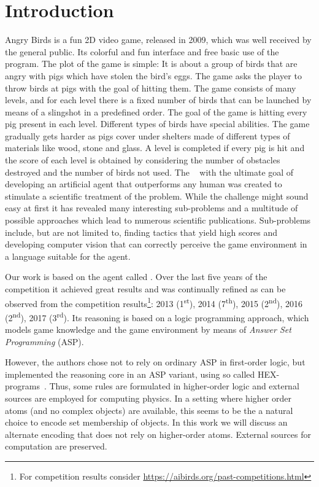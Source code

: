 \section{Introduction}
\label{sec:intro}

Angry Birds is a fun 2D video game, released in 2009, which was well received by the general public. Its colorful and fun interface and free basic use of
the program. The plot of the game is simple: It is about a group of birds that are angry with pigs which have stolen the bird's eggs. The game asks the player to throw birds at pigs with the goal of hitting them. The game consists of many levels, and for each level there is a fixed number of birds that can be launched by means of a slingshot in a predefined order. The goal of the game is hitting every pig present in each level. Different types of birds have special abilities. The game gradually gets harder as pigs cover under shelters made of different types of materials like wood, stone and glass. A level is completed if every pig is hit and the score of each level is obtained by considering the number of obstacles destroyed and the number of birds not used.
The \abc~\cite{angryAI} with the ultimate goal of developing an artificial agent that outperforms any human was created to stimulate a scientific treatment of the problem. While the challenge might sound easy at first it has revealed many interesting sub-problems and a multitude of possible approaches which lead to numerous scientific publications.
Sub-problems include, but are not limited to, finding tactics that yield high scores and developing computer vision that can correctly perceive the game environment in a language suitable for the agent.

Our work is based on the agent called \ah \cite{angryhex}. Over the last five years of the competition it achieved great results and was continually refined as can be observed from the competition results\footnote{For competition results consider \url{https://aibirds.org/past-competitions.html}}: 2013 (1\textsuperscript{st}), 2014 (7\textsuperscript{th}), 2015 (2\textsuperscript{nd}), 2016 (2\textsuperscript{nd}), 2017 (3\textsuperscript{rd}). Its reasoning is based on a logic programming approach, which models game knowledge and the game environment by means of \emph{Answer Set Programming} (ASP).

However, the authors chose not to rely on ordinary ASP in first-order logic, but implemented the reasoning core in an ASP variant, using so called HEX-programs~\cite{hex}. Thus, some rules are formulated in higher-order logic and external sources are employed for computing physics. In a setting where higher order atoms (and no complex objects) are available, this seems to be the a natural choice to encode set membership of objects. In this work we will discuss an alternate encoding that does not rely on higher-order atoms. External sources for computation are preserved.

